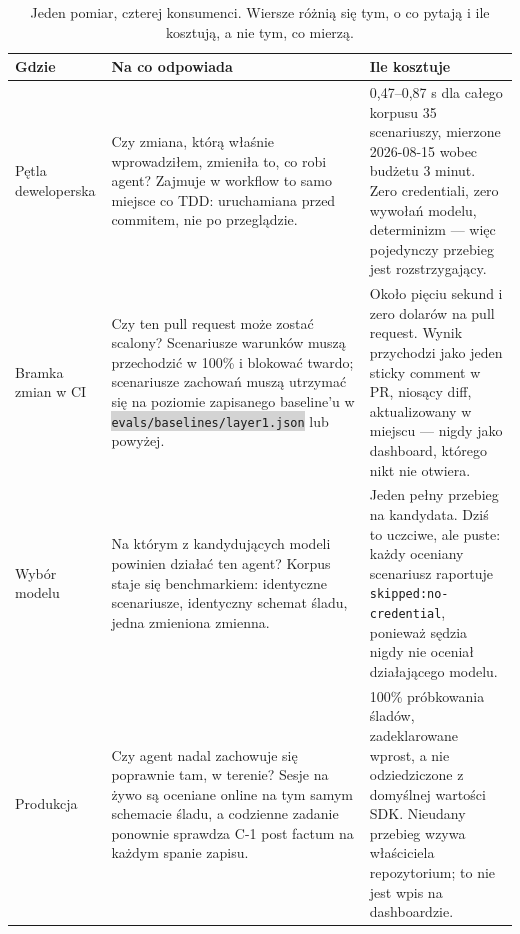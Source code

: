 \documentclass[11pt,a4paper]{article}
\newcommand{\repopath}[1]{\colorbox{lightgray}{\texttt{#1}}}
\begin{document}
\begin{table}[htbp]
\centering
\small
\begin{tabularx}{\linewidth}{@{}>{\raggedright\arraybackslash}p{2.5cm}XX@{}}
\toprule
\textbf{Gdzie} & \textbf{Na co odpowiada} & \textbf{Ile kosztuje} \\
\midrule
Pętla deweloperska &
Czy zmiana, którą właśnie wprowadziłem, zmieniła to, co robi agent? Zajmuje w
workflow to samo miejsce co TDD: uruchamiana przed commitem, nie po
przeglądzie. &
0,47--0,87 s dla całego korpusu 35 scenariuszy, mierzone 2026-08-15 wobec
budżetu 3 minut. Zero credentiali, zero wywołań modelu, determinizm --- więc
pojedynczy przebieg jest rozstrzygający. \\
\addlinespace
Bramka zmian w CI &
Czy ten pull request może zostać scalony? Scenariusze warunków muszą przechodzić
w 100\% i blokować twardo; scenariusze zachowań muszą utrzymać się na poziomie
zapisanego baseline'u w \repopath{evals/baselines/layer1.json} lub powyżej.
&
Około pięciu sekund i zero dolarów na pull request. Wynik przychodzi jako jeden
sticky comment w PR, niosący diff, aktualizowany w miejscu --- nigdy jako
dashboard, którego nikt nie otwiera. \\
\addlinespace
Wybór modelu &
Na którym z kandydujących modeli powinien działać ten agent? Korpus staje się
benchmarkiem: identyczne scenariusze, identyczny schemat śladu, jedna zmieniona
zmienna. &
Jeden pełny przebieg na kandydata. Dziś to uczciwe, ale puste: każdy oceniany
scenariusz raportuje \texttt{skipped:no-credential}, ponieważ sędzia nigdy nie
oceniał działającego modelu. \\
\addlinespace
Produkcja &
Czy agent nadal zachowuje się poprawnie tam, w terenie? Sesje na żywo są oceniane
online na tym samym schemacie śladu, a codzienne zadanie ponownie sprawdza C-1
post factum na każdym spanie zapisu. &
100\% próbkowania śladów, zadeklarowane wprost, a nie odziedziczone z domyślnej
wartości SDK. Nieudany przebieg wzywa właściciela repozytorium; to nie jest wpis
na dashboardzie. \\
\bottomrule
\end{tabularx}
\caption{Jeden pomiar, czterej konsumenci. Wiersze różnią się tym, o co pytają i
ile kosztują, a nie tym, co mierzą.}
\label{tab:consumers}
\end{table}
\end{document}
